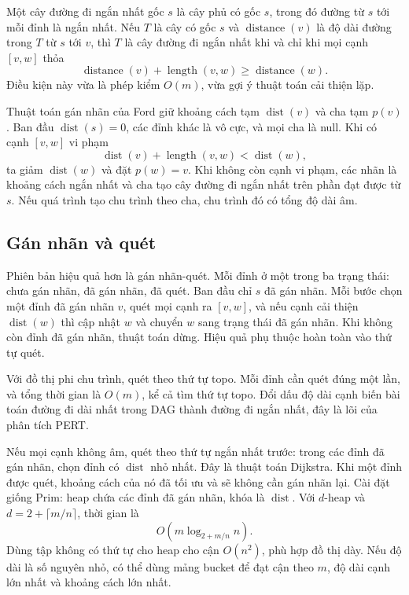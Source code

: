 \documentclass[11pt]{article}
\begin{document}
Một cây đường đi ngắn nhất gốc \(s\) là cây phủ có gốc \(s\), trong đó đường từ
\(s\) tới mỗi đỉnh là ngắn nhất. Nếu \(T\) là cây có gốc \(s\) và
\(\operatorname{distance}(v)\) là độ dài đường trong \(T\) từ \(s\) tới \(v\),
thì \(T\) là cây đường đi ngắn nhất khi và chỉ khi mọi cạnh \([v,w]\) thỏa
\[
  \operatorname{distance}(v)+\operatorname{length}(v,w)
  \ge \operatorname{distance}(w).
\]
Điều kiện này vừa là phép kiểm \(O(m)\), vừa gợi ý thuật toán cải thiện lặp.

Thuật toán gán nhãn của Ford giữ khoảng cách tạm \(\operatorname{dist}(v)\) và
cha tạm \(p(v)\). Ban đầu \(\operatorname{dist}(s)=0\), các đỉnh khác là vô cực,
và mọi cha là null. Khi có cạnh \([v,w]\) vi phạm
\[
  \operatorname{dist}(v)+\operatorname{length}(v,w)<\operatorname{dist}(w),
\]
ta giảm \(\operatorname{dist}(w)\) và đặt \(p(w)=v\). Khi không còn cạnh vi phạm,
các nhãn là khoảng cách ngắn nhất và cha tạo cây đường đi ngắn nhất trên phần đạt
được từ \(s\). Nếu quá trình tạo chu trình theo cha, chu trình đó có tổng độ dài
âm.

\subsection*{Gán nhãn và quét}

Phiên bản hiệu quả hơn là gán nhãn-quét. Mỗi đỉnh ở một trong ba trạng thái:
chưa gán nhãn, đã gán nhãn, đã quét. Ban đầu chỉ \(s\) đã gán nhãn. Mỗi bước
chọn một đỉnh đã gán nhãn \(v\), quét mọi cạnh ra \([v,w]\), và nếu cạnh cải
thiện \(\operatorname{dist}(w)\) thì cập nhật \(w\) và chuyển \(w\) sang trạng
thái đã gán nhãn. Khi không còn đỉnh đã gán nhãn, thuật toán dừng. Hiệu quả phụ
thuộc hoàn toàn vào thứ tự quét.

Với đồ thị phi chu trình, quét theo thứ tự topo. Mỗi đỉnh cần quét đúng một lần,
và tổng thời gian là \(O(m)\), kể cả tìm thứ tự topo. Đổi dấu độ dài cạnh biến
bài toán đường đi dài nhất trong DAG thành đường đi ngắn nhất, đây là lõi của
phân tích PERT.

Nếu mọi cạnh không âm, quét theo thứ tự ngắn nhất trước: trong các đỉnh đã gán
nhãn, chọn đỉnh có \(\operatorname{dist}\) nhỏ nhất. Đây là thuật toán Dijkstra.
Khi một đỉnh được quét, khoảng cách của nó đã tối ưu và sẽ không cần gán nhãn
lại. Cài đặt giống Prim: heap chứa các đỉnh đã gán nhãn, khóa là
\(\operatorname{dist}\). Với \(d\)-heap và \(d=2+\lceil m/n\rceil\), thời gian là
\[
  O(m\log_{2+m/n} n).
\]
Dùng tập không có thứ tự cho heap cho cận \(O(n^2)\), phù hợp đồ thị dày. Nếu
độ dài là số nguyên nhỏ, có thể dùng mảng bucket để đạt cận theo \(m\), độ dài
cạnh lớn nhất và khoảng cách lớn nhất.
\end{document}
